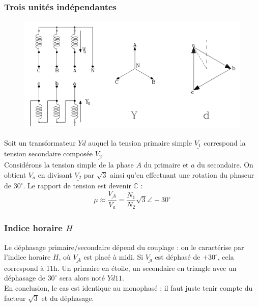 		\subsubsection{Trois unités indépendantes}
		\begin{figure}
		\vspace{-8mm}
		\includegraphics[scale=0.45]{ch3/imager6.png}
		\end{figure}			
		Soit un transformateur $Yd$ auquel la tension primaire simple $\underline{V_1}$ 
		correspond la tension secondaire composée $\underline{V_2}$.\\

				Considérons la tension simple de la phase $A$ du primaire et $a$ du secondaire. 
		On obtient $V_a$ en divisant $\underline{V_2}$ par $\sqrt{3}$ ainsi qu'en 
		effectuant une rotation du phaseur de $30^\circ$. Le rapport de tension est 
		devenir $\mathbb{C}$ :
		\begin{equation}
		\mu \approx \dfrac{\underline{V_A}}{\underline{V_a}} = \dfrac{N_1}{N_2}\sqrt{3}
		\angle-30^\circ
		\end{equation}
	
		\subsubsection{Indice horaire $H$}
		Le déphasage primaire/secondaire dépend du couplage : on le caractérise par 
		l'indice horaire $H$, où $\underline{V_A}$ est placé à midi. Si $\underline{V_a}$ 
		est déphasé de $+30^\circ$, cela correspond à 11h. Un primaire en étoile, 
		un secondaire en triangle avec un déphasage de $30^\circ$ sera alors noté
		$Yd11$.\\
		
		En conclusion, le cas est identique au monophasé : il faut juste tenir compte 
		du facteur $\sqrt{3}$ et du déphasage.
	
	
	
	
	
	
	
	
	
	
	
	
	
	
	
	
	
	
	
	
	
	